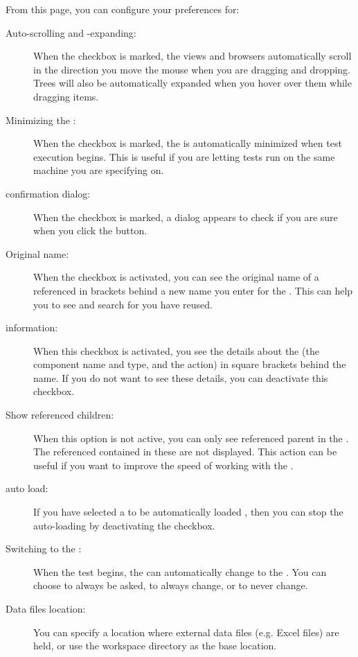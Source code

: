From this page, you can configure your preferences for:
\begin{description}
\item [Auto-scrolling and -expanding:]{When the checkbox is marked, the views and browsers  automatically scroll in the direction you move the mouse when you are dragging and dropping. Trees will also be automatically expanded when you hover over them while dragging items.}
\item [Minimizing the \ite{}:]{When the checkbox is marked, the \ite{} is automatically minimized when test execution begins. This is useful if you are letting tests run on the same machine you are specifying on.}
\item [\gdaut{} confirmation dialog:]{When the checkbox is marked, a dialog appears to check if you are sure when you click the   button.}
\item [Original \gdcase{} name:]{When the checkbox is activated, you can see the original name of a referenced \gdcase{} in brackets behind a new name you enter for the \gdcase{}. This can help you to see and search for \gdcases{} you have reused. }
\item[\gdstep{} information:]{When this checkbox is activated, you see the details about the \gdstep{} (the component name and type, and the action) in square brackets behind the \gdstep{} name. If you do not want to see these details, you can deactivate this checkbox.}
\item[Show referenced children:]{When this option is not active, you can only see  referenced parent \gdcases{} in the \gdtestcasebrowser{}. The referenced \gdcases{} contained in these \gdcases{} are not displayed. This action can be useful if you want to improve the speed of working with the \ite{}.}
\item [\gdproject{} auto load:]{If you have selected a \gdproject{} to be automatically loaded , then you can stop the auto-loading by deactivating the checkbox.}
\item [Switching to the \execpersp{}:]{When the test begins, the \ite{} can automatically change to the \execpersp{}. You can choose to always be asked, to always change, or to never change. }
\item [Data files location:]{You can specify a location where external data files (e.g. Excel files) are held, or use the workspace directory as the base location. }
\end{description}

 

